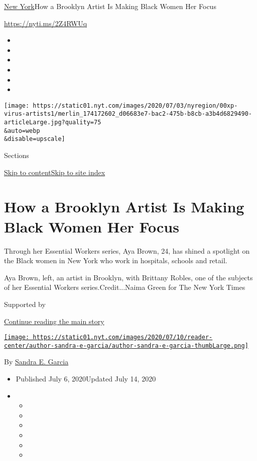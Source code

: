 \href{/section/nyregion}{New York}\textbar{}How a Brooklyn Artist Is
Making Black Women Her Focus

\url{https://nyti.ms/2Z4RWUq}

\begin{itemize}
\item
\item
\item
\item
\item
\item
\end{itemize}

\texttt{[image: https://static01.nyt.com/images/2020/07/03/nyregion/00xp-virus-artists1/merlin\_174172602\_d06683e7-bac2-475b-b8cb-a3b4d6829490-articleLarge.jpg?quality=75\\\&auto=webp\\\&disable=upscale]}

Sections

\protect\hyperlink{site-content}{Skip to
content}\protect\hyperlink{site-index}{Skip to site index}

\hypertarget{how-a-brooklyn-artist-is-making-black-women-her-focus}{%
\section{How a Brooklyn Artist Is Making Black Women Her
Focus}\label{how-a-brooklyn-artist-is-making-black-women-her-focus}}

Through her Essential Workers series, Aya Brown, 24, has shined a
spotlight on the Black women in New York who work in hospitals, schools
and retail.

Aya Brown, left, an artist in Brooklyn, with Brittany Robles, one of the
subjects of her Essential Workers series.Credit...Naima Green for The
New York Times

Supported by

\protect\hyperlink{after-sponsor}{Continue reading the main story}

\href{https://www.nytimes.com/by/sandra-e-garcia}{\texttt{[image: https://static01.nyt.com/images/2020/07/10/reader-center/author-sandra-e-garcia/author-sandra-e-garcia-thumbLarge.png]}}

By \href{https://www.nytimes.com/by/sandra-e-garcia}{Sandra E. Garcia}

\begin{itemize}
\item
  Published July 6, 2020Updated July 14, 2020
\item
  \begin{itemize}
  \item
  \item
  \item
  \item
  \item
  \item
  \end{itemize}
\end{itemize}

